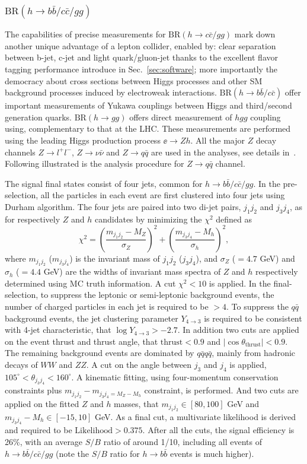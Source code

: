 \subsubsection{$\mathrm{BR}(h\to b\bar{b}/c\bar{c}/gg)$}
The capabilities of precise measurements for $\mathrm{BR}(h\to c\bar{c}/gg)$ 
mark down another unique advantage of a lepton collider, enabled by:
clear separation between b-jet, c-jet and light quark/gluon-jet thanks to the
excellent flavor tagging performance introduce in Sec.~\ref{sec:software};
more importantly the democracy about cross sections between Higgs processes and
other SM background processes induced by electroweak interactions.
$\mathrm{BR}(h\to b\bar{b}/c\bar{c})$ offer important measurements of 
Yukawa couplings between Higgs and third/second generation quarks. 
$\mathrm{BR}(h\to gg)$ offers direct measurement of $hgg$ coupling 
using, complementary to that at the LHC. These measurements are performed
using the leading Higgs production process $\ee\to Zh$. All the major $Z$ decay
channels $Z\to l^+l^-$, $Z\to\nu\bar{\nu}$ and $Z\to q\bar{q}$ are used in the analyses,
see details in~\cite{Ono:2013sea}. Following illustrated is the analysis procedure 
for $Z\to q\bar{q}$ channel. 

The signal final states consist of four jets, common for $h\to b\bar{b}/c\bar{c}/gg$. 
In the pre-selection, all the particles
in each event are first clustered into four jets using Durham algorithm. The
four jets are paired into two di-jet pairs, $j_1j_2$ and $j_3j_4$, 
as for respectively $Z$ and $h$ candidates by minimizing the $\chi^2$ defined as 
$$\chi^2=(\frac{m_{j_1j_2}-M_Z}{\sigma_Z})^2+(\frac{m_{j_3j_4}-M_h}{\sigma_h})^2,$$
where $m_{j_1j_2}$ ($m_{j_3j_4}$) is the invariant mass of $j_1j_2$ ($j_3j_4$),
and $\sigma_Z$ ($=4.7$ GeV) and $\sigma_h$ ($=4.4$ GeV) are the widths
of invariant mass spectra of $Z$ and $h$ respectively determined using MC truth information. 
A cut $\chi^2<10$ is applied. In the final-selection, to suppress the leptonic or 
semi-leptonic background events, the number of
charged particles in each jet is required to be $> 4$. To suppress the $q\bar{q}$
background events, the jet clustering parameter $Y_{4\to3}$ 
is required to be consistent with 4-jet characteristic, that $\log Y_{4\to 3}>-2.7$.
In addition two cuts are applied on the event thrust and thrust angle,
that $\mathrm{thrust}<0.9$ and $|\cos\theta_{\mathrm{thrust}}|<0.9$. The remaining
background events are dominated by $q\bar{q}q\bar{q}$, mainly from hadronic decays of $WW$ and $ZZ$. 
A cut on the angle between $j_3$ and $j_4$ is applied, $105^\circ<\theta_{j_3j_4}<160^\circ$.
A kinematic fitting, using four-momentum conservation constraints plus 
$m_{j_1j_2}-m_{j_3j_4=M_Z-M_h}$ constraint, is performed. And two cuts are
applied on the fitted $Z$ and $h$ masses, 
that $m_{j_1j_2}\in[80,100]$ GeV and $m_{j_3j_4}-M_h\in[-15,10]$ GeV. As a final cut,
a multivariate likelihood is derived and required to be $\mathrm{Likelihood}>0.375$.
After all the cuts, the signal efficiency is 26\%, with an average $S/B$ ratio of around 1/10, 
including all events of $h\to b\bar{b}/c\bar{c}/gg$ (note the $S/B$ ratio for $h\to b\bar{b}$ events
is much higher). 

